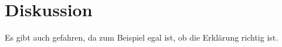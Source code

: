 \chapter{Diskussion}

Es gibt auch gefahren, da zum Beispiel egal ist, ob die Erklärung richtig ist.